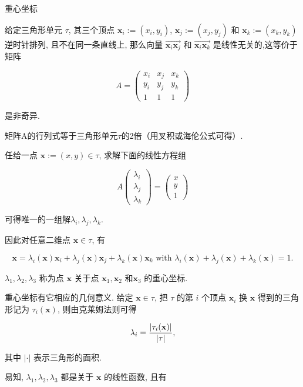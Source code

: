 \documentclass{article}
\begin{document}
{\large 重心坐标}

给定三角形单元 $\tau$, 其三个顶点 $\mathbf{x}_i :=(x_i,y_i)$, $\mathbf{x}_j :=(x_j,y_j)$ 和 $\mathbf{x}_k :=(x_k,y_k)$ 逆时针排列, 且不在同一条直线上, 那么向量 $\overrightarrow{\mathbf{x}_i\mathbf{x}_j}$ 和 $\overrightarrow{\mathbf{x}_i\mathbf{x}_k}$ 是线性无关的,这等价于矩阵

$$
A = 
\begin{pmatrix}
x_i & x_j & x_k \\
y_i & y_j & y_k \\
1   & 1   & 1 
\end{pmatrix}
$$

是非奇异. 

矩阵A的行列式等于三角形单元$\tau$的2倍（用叉积或海伦公式可得）.

任给一点 $\mathbf{x}:=(x,y)\in\tau$, 求解下面的线性方程组

$$
A 
\begin{pmatrix}
\lambda_i \\
\lambda_j\\
\lambda_k  
\end{pmatrix}
=\begin{pmatrix}
x \\
y\\
1  
\end{pmatrix}
$$

可得唯一的一组解$\lambda_i,\lambda_j,\lambda_k$. 

因此对任意二维点 $\mathbf{x}\in\tau$, 有

$$
\mathbf{x}=\lambda_i(\mathbf{x})\mathbf{x}_i + \lambda_j(\mathbf{x})\mathbf{x}_j + \lambda_k(\mathbf{x})\mathbf{x}_k 
\text{ with } \lambda_i(\mathbf{x}) + \lambda_j(\mathbf{x}) + \lambda_k(\mathbf{x}) = 1. 
$$

$\lambda_1,\lambda_2,\lambda_3$ 称为点 $\mathbf{x}$ 关于点 $\mathbf{x}_1,\mathbf{x}_2$ 和$\mathbf{x}_3$ 的重心坐标. 

重心坐标有它相应的几何意义. 给定 $\mathbf x\in\tau$, 把 $\tau$ 的第 $i$ 个顶点 $\mathbf{x}_i$ 换 $\mathbf{x}$
得到的三角形记为 $\tau_i(\mathbf{x})$, 则由克莱姆法则可得

\begin{equation}\label{eq:bc}
\lambda_i = {|\tau_i(\mathbf{x})| \over |\tau|},
\end{equation}

其中 $|\cdot|$ 表示三角形的面积.

易知, $\lambda_1, \lambda_2, \lambda_3$ 都是关于 $\mathbf x$ 的线性函数, 且有
\end{document}
